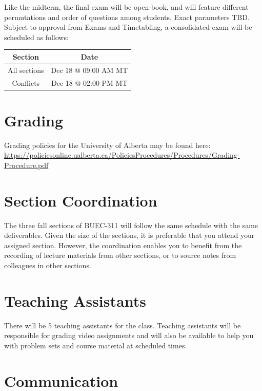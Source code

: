 \documentclass[11pt,]{article}
\begin{document}
Like the midterm, the final exam will be open-book, and will feature
different permutations and order of questions among students. Exact
parameters TBD. Subject to approval from Exams and Timetabling, a
consolidated exam will be scheduled as follows:

\begin{table}[!h]
\centering
\begin{tabular}{cc}
\toprule
Section & Date\\
\midrule
All sections & Dec 18 @ 09:00 AM MT\\
Conflicts & Dec 18 @ 02:00 PM MT\\
\bottomrule
\end{tabular}
\end{table}


\hypertarget{grading}{%
\section{Grading}\label{grading}}

Grading policies for the University of Alberta may be found here:
\url{https://policiesonline.ualberta.ca/PoliciesProcedures/Procedures/Grading-Procedure.pdf}



\hypertarget{section-coordination}{%
\section{Section Coordination}\label{section-coordination}}

The three fall sections of BUEC-311 will follow the same schedule with
the same deliverables. Given the size of the sections, it is preferable
that you attend your assigned section. However, the coordination enables
you to benefit from the recording of lecture materials from other
sections, or to source notes from colleagues in other sections.

\hypertarget{teaching-assistants}{%
\section{Teaching Assistants}\label{teaching-assistants}}

There will be 5 teaching assistants for the class. Teaching assistants
will be responsible for grading video assignments and will also be
available to help you with problem sets and course material at scheduled
times.

\hypertarget{communication}{%
\section{Communication}\label{communication}}
\end{document}
